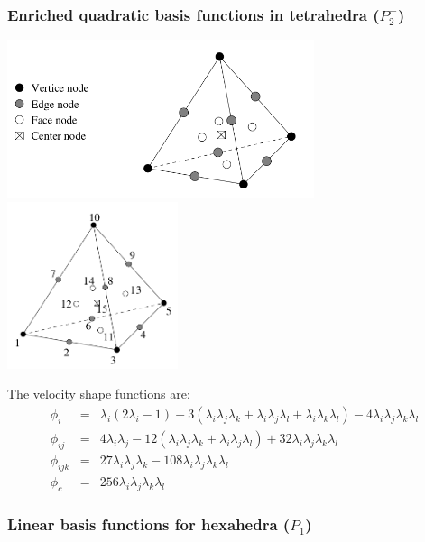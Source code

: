 \subsubsection{Enriched quadratic basis functions in tetrahedra ($P_2^+$)}

\includegraphics[width=9cm]{images/crouzeix-raviart/p2pp1_3D1}
\includegraphics[width=5cm]{images/crouzeix-raviart/p2pp1_3D2}

The velocity shape functions are:
\begin{eqnarray}
\phi_i &=& \lambda_i(2\lambda_i-1) + 3 (\lambda_i\lambda_j \lambda_k + \lambda_i\lambda_j\lambda_l + \lambda_i\lambda_k\lambda_l) -4 \lambda_i\lambda_j\lambda_k\lambda_l \\
\phi_{ij} &=& 4\lambda_i\lambda_j - 12( \lambda_i\lambda_j\lambda_k+\lambda_i\lambda_j\lambda_l  ) +32 \lambda_i\lambda_j\lambda_k \lambda_l \\
\phi_{ijk} &=& 27  \lambda_i\lambda_j\lambda_k - 108 \lambda_i\lambda_j\lambda_k \lambda_l \\
\phi_c &=& 256 \lambda_i\lambda_j\lambda_k\lambda_l
\end{eqnarray}


\subsubsection{Linear basis functions for hexahedra ($P_1$)} \label{ss:lbfh3D}

